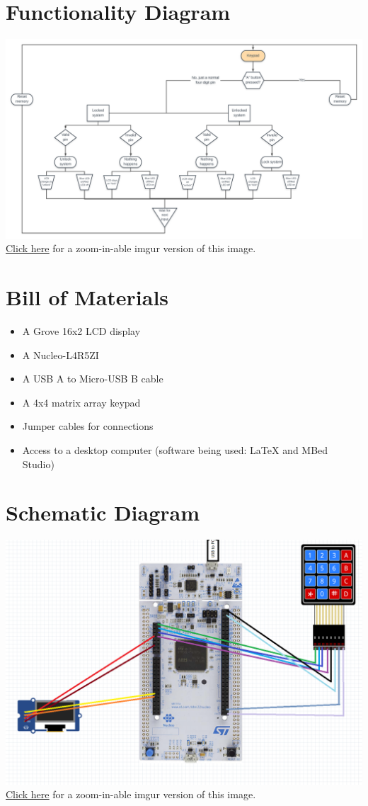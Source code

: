 \documentclass[10pt,a4paper]{article}
\begin{document}
	\section{Functionality Diagram}
	\includegraphics[width=\linewidth]{Flowchart}\\
	\href{https://i.imgur.com/dgIrW47.png}{\underline{Click here}} for a zoom-in-able imgur version of this image.
	\pagebreak
	\section{Bill of Materials}
	\begin{itemize}
		\item A Grove 16x2 LCD display
		\item A Nucleo-L4R5ZI
		\item A USB A to Micro-USB B cable
		\item A 4x4 matrix array keypad
		\item Jumper cables for connections
		\item Access to a desktop computer (software being used: \LaTeX{ }and MBed Studio)
	\end{itemize}
	\pagebreak
	\section{Schematic Diagram}
	\includegraphics[width=\linewidth]{Schematic Diagram}\\
	\href{https://i.imgur.com/9wGSV8Q.png}{\underline{Click here}} for a zoom-in-able imgur version of this image.
	\pagebreak
\end{document}
